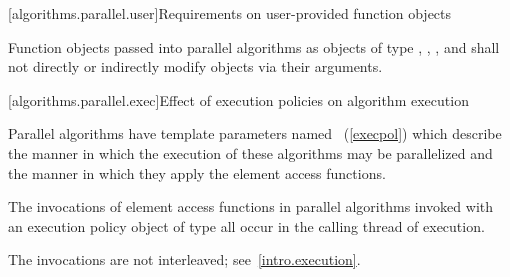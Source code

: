 [algorithms.parallel.user]{Requirements on user-provided function objects}

\pnum
Function objects passed into parallel algorithms as objects of type
, , , and
 shall not directly or indirectly modify objects via
their arguments.

[algorithms.parallel.exec]{Effect of execution policies on algorithm execution}

\pnum
Parallel algorithms have template parameters
named ~(\ref{execpol})
which describe the manner in which the execution of these algorithms may be
parallelized and the manner in which they apply the element access functions.

\pnum
The invocations of element access functions in parallel algorithms invoked with
an execution policy object of type  all occur
in the calling thread of execution.
\begin{note}
The invocations are not interleaved; see~\ref{intro.execution}.
\end{note}


